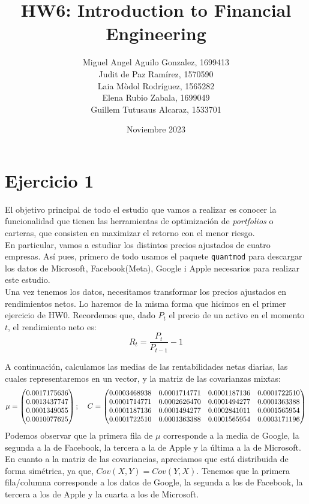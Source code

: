 \documentclass[a4paper,]{article}
\title{\textbf{HW6: Introduction to Financial Engineering}}
\author{Miguel Angel Aguilo Gonzalez, 1699413 \\ Judit de Paz Ramírez, 1570590 \\ Laia Mòdol Rodríguez, 1565282 \\ Elena Rubio Zabala, 1699049 \\ Guillem Tutusaus Alcaraz, 1533701 }
\date{Noviembre 2023}
\begin{document}
\maketitle

\newpage

\section*{Ejercicio 1}
El objetivo principal de todo el estudio que vamos a realizar es conocer la funcionalidad que tienen las herramientas de optimización de \textit{portfolios} o carteras, que consisten en maximizar el retorno con el menor riesgo. \\

En particular, vamos a estudiar los distintos precios ajustados de cuatro empresas. Así pues, primero de todo usamos el paquete \texttt{quantmod} para descargar los datos de Microsoft, Facebook(Meta), Google i Apple necesarios para realizar este estudio. \\

Una vez tenemos los datos, necesitamos transformar los precios ajustados en rendimientos netos. Lo haremos de la misma forma que hicimos en el primer ejercicio de HW0. Recordemos que, dado $P_t$ el precio de un activo en el momento $t$, el rendimiento neto es:
$$R_t=\frac{P_t}{P_{t-1}}-1$$

A continuación, calculamos las medias de las rentabilidades netas diarias, las cuales representaremos en un vector, y la matriz de las covarianzas mixtas:
$$\mu=\begin{pmatrix}
0.0017175636 \\ 0.0013437747 \\ 0.0001349055 \\ 0.0010077625 \\
\end{pmatrix}; \hspace{0,4cm}
C= \begin{pmatrix}
0.0003468938 & 0.0001714771 & 0.0001187136 & 0.0001722510 \\
 0.0001714771& 0.0002626470 & 0.0001494277 & 0.0001363388 \\
 0.0001187136 & 0.0001494277 & 0.0002841011 & 0.0001565954 \\
 0.0001722510 & 0.0001363388 & 0.0001565954 & 0.0003171196 \\
\end{pmatrix}$$
Podemos observar que la primera fila de $\mu$ corresponde a la media de Google, la segunda a la de Facebook, la tercera a la de Apple y la última a la de Microsoft. En cuanto a la matriz de las covariancias, apreciamos que está distribuida de forma simétrica, ya que, $Cov(X, Y ) = Cov(Y, X)$. Tenemos que la primera fila/columna corresponde a los datos de Google, la segunda a los de Facebook, la tercera a los de Apple y la cuarta a los de Microsoft. \\
\end{document}
